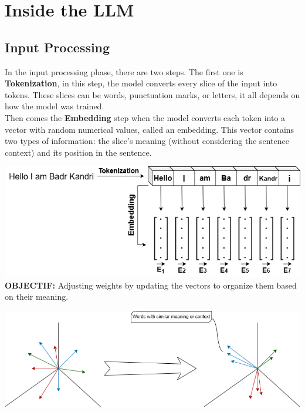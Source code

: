 \documentclass[12pt]{article}
\begin{document}
\newpage
\section{Inside the LLM}
\subsection{Input Processing}
In the input processing phase, there are two steps. The first one is \textbf{Tokenization}, in this step, the model converts every slice of the input into tokens. These slices can be words, punctuation marks, or letters, it all depends on how the model was trained.\\Then comes the \textbf{Embedding} step when the model converts each token into a vector with random numerical values, called an embedding. This vector contains two types of information: the slice’s meaning (without considering the sentence context) and its position in the sentence.

\vspace*{1.5cm}
\hspace{-1.5cm}
\includegraphics[width=1.1\textwidth]{images/llm3.png}
\vspace*{1.5cm}
\textbf{OBJECTIF:} Adjusting weights by updating the vectors to organize them based on their meaning.


\begin{center}
\includegraphics[width=\textwidth]{images/llm4.png}
\end{center}

\newpage
\end{document}

